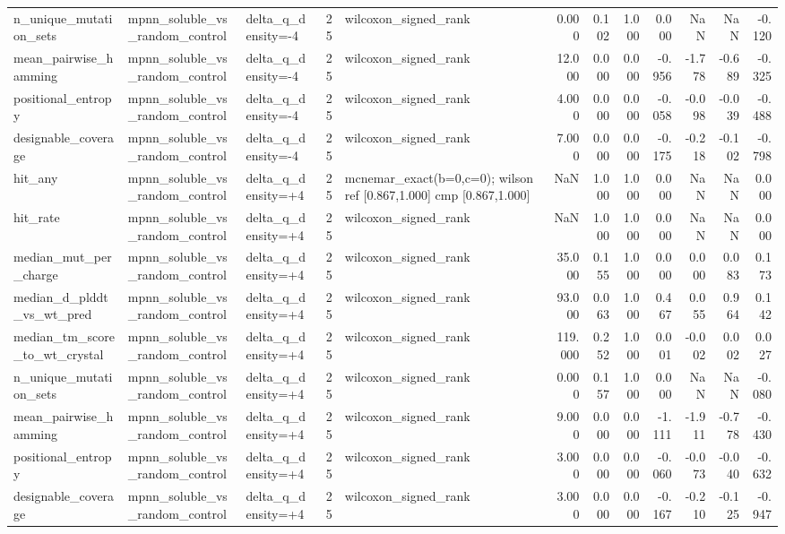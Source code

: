 \begin{table}
{\begin{tabular}{lllrlrrrrrrr}
n\_unique\_mutation\_sets & mpnn\_soluble\_vs\_random\_control & delta\_q\_density=-4 & 25 & wilcoxon\_signed\_rank & 0.000 & 0.102 & 1.000 & 0.000 & NaN & NaN & -0.120 \\
mean\_pairwise\_hamming & mpnn\_soluble\_vs\_random\_control & delta\_q\_density=-4 & 25 & wilcoxon\_signed\_rank & 12.000 & 0.000 & 0.000 & -0.956 & -1.778 & -0.689 & -0.325 \\
positional\_entropy & mpnn\_soluble\_vs\_random\_control & delta\_q\_density=-4 & 25 & wilcoxon\_signed\_rank & 4.000 & 0.000 & 0.000 & -0.058 & -0.098 & -0.039 & -0.488 \\
designable\_coverage & mpnn\_soluble\_vs\_random\_control & delta\_q\_density=-4 & 25 & wilcoxon\_signed\_rank & 7.000 & 0.000 & 0.000 & -0.175 & -0.218 & -0.102 & -0.798 \\
hit\_any & mpnn\_soluble\_vs\_random\_control & delta\_q\_density=+4 & 25 & mcnemar\_exact(b=0,c=0); wilson ref [0.867,1.000] cmp [0.867,1.000] & NaN & 1.000 & 1.000 & 0.000 & NaN & NaN & 0.000 \\
hit\_rate & mpnn\_soluble\_vs\_random\_control & delta\_q\_density=+4 & 25 & wilcoxon\_signed\_rank & NaN & 1.000 & 1.000 & 0.000 & NaN & NaN & 0.000 \\
median\_mut\_per\_charge & mpnn\_soluble\_vs\_random\_control & delta\_q\_density=+4 & 25 & wilcoxon\_signed\_rank & 35.000 & 0.155 & 1.000 & 0.000 & 0.000 & 0.083 & 0.173 \\
median\_d\_plddt\_vs\_wt\_pred & mpnn\_soluble\_vs\_random\_control & delta\_q\_density=+4 & 25 & wilcoxon\_signed\_rank & 93.000 & 0.063 & 1.000 & 0.467 & 0.055 & 0.964 & 0.142 \\
median\_tm\_score\_to\_wt\_crystal & mpnn\_soluble\_vs\_random\_control & delta\_q\_density=+4 & 25 & wilcoxon\_signed\_rank & 119.000 & 0.252 & 1.000 & 0.001 & -0.002 & 0.002 & 0.027 \\
n\_unique\_mutation\_sets & mpnn\_soluble\_vs\_random\_control & delta\_q\_density=+4 & 25 & wilcoxon\_signed\_rank & 0.000 & 0.157 & 1.000 & 0.000 & NaN & NaN & -0.080 \\
mean\_pairwise\_hamming & mpnn\_soluble\_vs\_random\_control & delta\_q\_density=+4 & 25 & wilcoxon\_signed\_rank & 9.000 & 0.000 & 0.000 & -1.111 & -1.911 & -0.778 & -0.430 \\
positional\_entropy & mpnn\_soluble\_vs\_random\_control & delta\_q\_density=+4 & 25 & wilcoxon\_signed\_rank & 3.000 & 0.000 & 0.000 & -0.060 & -0.073 & -0.040 & -0.632 \\
designable\_coverage & mpnn\_soluble\_vs\_random\_control & delta\_q\_density=+4 & 25 & wilcoxon\_signed\_rank & 3.000 & 0.000 & 0.000 & -0.167 & -0.210 & -0.125 & -0.947 \\

\end{tabular}}
\end{table}
